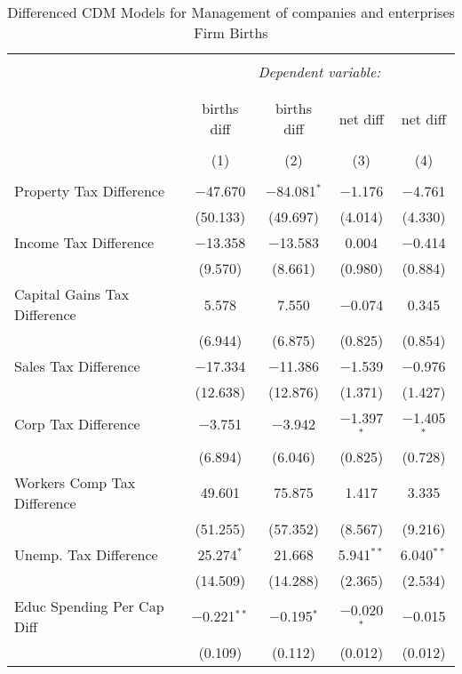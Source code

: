 
\begin{table}[!htbp] \centering 
  \caption{Differenced CDM Models for  Management of companies and enterprises Firm Births} 
  \label{} 
\begin{tabular}{@{\extracolsep{5pt}}lcccc} 
\\[-1.8ex]\hline 
\hline \\[-1.8ex] 
 & \multicolumn{4}{c}{\textit{Dependent variable:}} \\ 
\cline{2-5} 
\\[-1.8ex] & \multicolumn{4}{c}{ } \\ 
 & births diff & births diff & net diff & net diff \\ 
\\[-1.8ex] & (1) & (2) & (3) & (4)\\ 
\hline \\[-1.8ex] 
 Property Tax Difference & $-$47.670 & $-$84.081$^{*}$ & $-$1.176 & $-$4.761 \\ 
  & (50.133) & (49.697) & (4.014) & (4.330) \\ 
  Income Tax Difference & $-$13.358 & $-$13.583 & 0.004 & $-$0.414 \\ 
  & (9.570) & (8.661) & (0.980) & (0.884) \\ 
  Capital Gains Tax Difference & 5.578 & 7.550 & $-$0.074 & 0.345 \\ 
  & (6.944) & (6.875) & (0.825) & (0.854) \\ 
  Sales Tax Difference & $-$17.334 & $-$11.386 & $-$1.539 & $-$0.976 \\ 
  & (12.638) & (12.876) & (1.371) & (1.427) \\ 
  Corp Tax Difference & $-$3.751 & $-$3.942 & $-$1.397$^{*}$ & $-$1.405$^{*}$ \\ 
  & (6.894) & (6.046) & (0.825) & (0.728) \\ 
  Workers Comp Tax Difference & 49.601 & 75.875 & 1.417 & 3.335 \\ 
  & (51.255) & (57.352) & (8.567) & (9.216) \\ 
  Unemp. Tax Difference & 25.274$^{*}$ & 21.668 & 5.941$^{**}$ & 6.040$^{**}$ \\ 
  & (14.509) & (14.288) & (2.365) & (2.534) \\ 
  Educ Spending Per Cap Diff & $-$0.221$^{**}$ & $-$0.195$^{*}$ & $-$0.020$^{*}$ & $-$0.015 \\ 
  & (0.109) & (0.112) & (0.012) & (0.012) \\ 

\end{tabular}
\end{table}
